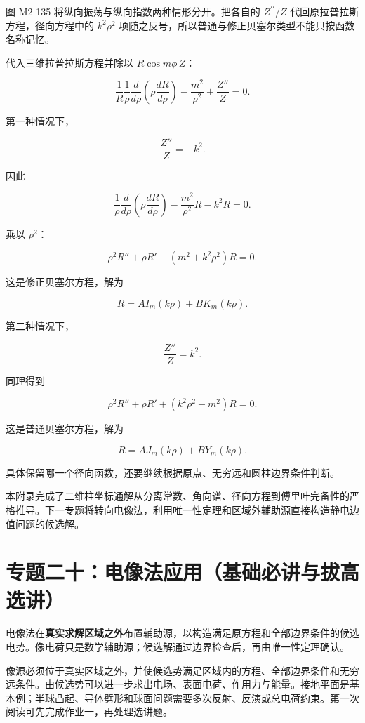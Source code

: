 图 M2-135 将纵向振荡与纵向指数两种情形分开。把各自的
\(Z^{\prime\prime}/Z\) 代回原拉普拉斯方程，径向方程中的 \(k^2\rho^2\)
项随之反号，所以普通与修正贝塞尔类型不能只按函数名称记忆。

代入三维拉普拉斯方程并除以 \(R\cos m\phi\,Z\)：

\[
\frac1R
\frac1\rho\frac{d}{d\rho}
\left(
\rho\frac{dR}{d\rho}
\right)
-\frac{m^2}{\rho^2}
+\frac{Z''}{Z}
=0.
\]

第一种情况下，

\[
\frac{Z''}{Z}=-k^2.
\]

因此

\[
\frac1\rho\frac{d}{d\rho}
\left(
\rho\frac{dR}{d\rho}
\right)
-\frac{m^2}{\rho^2}R
-k^2R
=0.
\]

乘以 \(\rho^2\)：

\[
\boxed{
\rho^2R''+\rho R'
-\left(
m^2+k^2\rho^2
\right)R
=0
}.
\]

这是修正贝塞尔方程，解为

\[
\boxed{
R=A I_m(k\rho)+B K_m(k\rho)
}.
\]

第二种情况下，

\[
\frac{Z''}{Z}=k^2.
\]

同理得到

\[
\boxed{
\rho^2R''+\rho R'
+\left(
k^2\rho^2-m^2
\right)R
=0
}.
\]

这是普通贝塞尔方程，解为

\[
\boxed{
R=A J_m(k\rho)+B Y_m(k\rho)
}.
\]

具体保留哪一个径向函数，还要继续根据原点、无穷远和圆柱边界条件判断。

本附录完成了二维柱坐标通解从分离常数、角向谱、径向方程到傅里叶完备性的严格推导。下一专题将转向电像法，利用唯一性定理和区域外辅助源直接构造静电边值问题的候选解。

\section{专题二十：电像法应用（基础必讲与拔高选讲）}\label{m2:ux4e13ux9898ux4e8cux5341ux7535ux50cfux6cd5ux5e94ux7528ux57faux7840ux5fc5ux8bb2ux4e0eux62d4ux9ad8ux9009ux8bb2}

电像法在\textbf{真实求解区域之外}布置辅助源，以构造满足原方程和全部边界条件的候选电势。像电荷只是数学辅助源；候选解通过边界检查后，再由唯一性定理确认。

像源必须位于真实区域之外，并使候选势满足区域内的方程、全部边界条件和无穷远条件。由候选势可以进一步求出电场、表面电荷、作用力与能量。接地平面是基本例；半球凸起、导体劈形和球面问题需要多次反射、反演或总电荷约束。第一次阅读可先完成作业一，再处理选讲题。


